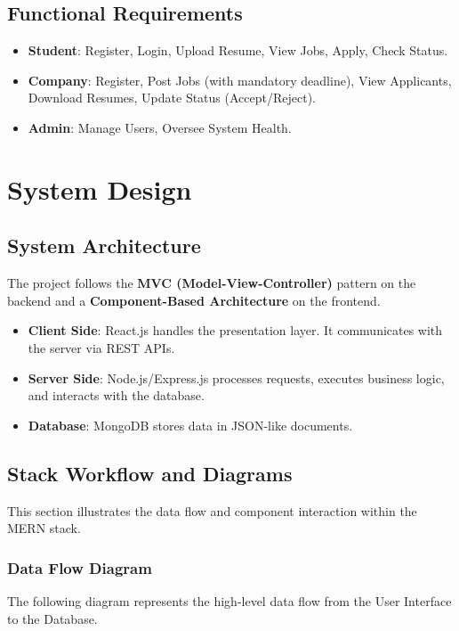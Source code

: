 \documentclass[12pt, a4paper]{report}
\begin{document}
\section{Functional Requirements}
\begin{itemize}
    \item \textbf{Student}: Register, Login, Upload Resume, View Jobs, Apply, Check Status.
    \item \textbf{Company}: Register, Post Jobs (with mandatory deadline), View Applicants, Download Resumes, Update Status (Accept/Reject).
    \item \textbf{Admin}: Manage Users, Oversee System Health.
\end{itemize}

\chapter{System Design}

\section{System Architecture}
The project follows the \textbf{MVC (Model-View-Controller)} pattern on the backend and a \textbf{Component-Based Architecture} on the frontend.
\begin{itemize}
\item \textbf{Client Side}: React.js handles the presentation layer. It communicates with the server via REST APIs.
    \item \textbf{Server Side}: Node.js/Express.js processes requests, executes business logic, and interacts with the database.
    \item \textbf{Database}: MongoDB stores data in JSON-like documents.
\end{itemize}

\section{Stack Workflow and Diagrams}
This section illustrates the data flow and component interaction within the MERN stack.

\subsection{Data Flow Diagram}
The following diagram represents the high-level data flow from the User Interface to the Database.
\end{document}
